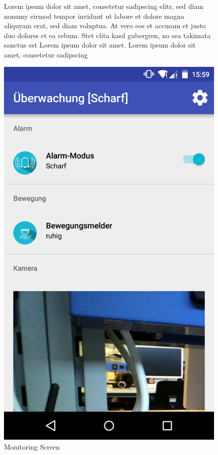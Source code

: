 \begin{figure}[htbp]
	\begin{minipage}{0.6\textwidth} 
Lorem ipsum dolor sit amet, consetetur sadipscing elitr, sed diam nonumy eirmod tempor invidunt ut labore et dolore magna aliquyam erat, sed diam voluptua. At vero eos et accusam et justo duo dolores et ea rebum. Stet clita kasd gubergren, no sea takimata sanctus est Lorem ipsum dolor sit amet. Lorem ipsum dolor sit amet, consetetur sadipscing 
	\end{minipage}
	\hfill
	\begin{minipage}{0.32\textwidth}
		\includegraphics[scale=0.12]{appendix/img/AppScreenshots/Screenshot5}
		\caption{Monitoring Screen}
		\label{fig:screenshot_5}
	\end{minipage}
\end{figure}
